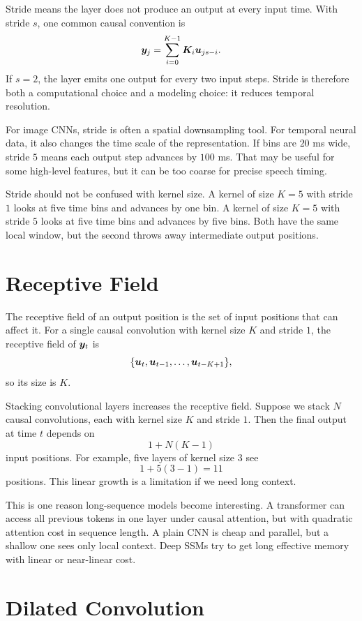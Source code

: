 Stride means the layer does not produce an output at every input time. With stride $s$,
one common causal convention is
\[
  \bm{y}_j = \sum_{i=0}^{K-1} \bm{K}_i \bm{u}_{js-i}.
\]
If $s=2$, the layer emits one output for every two input steps. Stride is therefore both
a computational choice and a modeling choice: it reduces temporal resolution.

For image CNNs, stride is often a spatial downsampling tool. For temporal neural data, it
also changes the time scale of the representation. If bins are $20$ ms wide, stride $5$
means each output step advances by $100$ ms. That may be useful for some high-level
features, but it can be too coarse for precise speech timing.

Stride should not be confused with kernel size. A kernel of size $K=5$ with stride $1$
looks at five time bins and advances by one bin. A kernel of size $K=5$ with stride $5$
looks at five time bins and advances by five bins. Both have the same local window, but
the second throws away intermediate output positions.

\section{Receptive Field}

The receptive field of an output position is the set of input positions that can affect
it. For a single causal convolution with kernel size $K$ and stride $1$, the receptive
field of $\bm{y}_t$ is
\[
  \{\bm{u}_t,\bm{u}_{t-1},\ldots,\bm{u}_{t-K+1}\},
\]
so its size is $K$.

Stacking convolutional layers increases the receptive field. Suppose we stack $N$ causal
convolutions, each with kernel size $K$ and stride $1$. Then the final output at time $t$
depends on
\[
  1 + N(K-1)
\]
input positions. For example, five layers of kernel size $3$ see
\[
  1 + 5(3-1) = 11
\]
positions. This linear growth is a limitation if we need long context.

This is one reason long-sequence models become interesting. A transformer can access all
previous tokens in one layer under causal attention, but with quadratic attention cost in
sequence length. A plain CNN is cheap and parallel, but a shallow one sees only local
context. Deep SSMs try to get long effective memory with linear or near-linear cost.

\section{Dilated Convolution}

